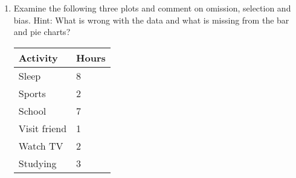 {\begin{enumerate}
\item Examine the following three plots and comment on omission, selection and bias. Hint: What is wrong with the data and what is missing from the bar and pie charts?

\begin{center}
\begin{tabular}{|l|l|}
\hline
Activity & Hours \\ 
\hline
Sleep        & 8 \\
Sports       & 2 \\
School       & 7 \\
Visit friend & 1 \\
Watch TV     & 2 \\
Studying     & 3 \\
\hline
\end{tabular}
\end{center}


\end{enumerate}}
